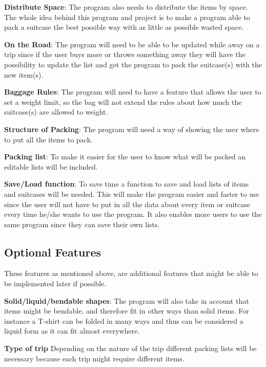 \textbf{Distribute Space}:
The program also needs to distribute the items by space. The whole idea behind this program and project is to make a program able to pack a suitcase the best possible way with as little as possible wasted space.
\newline

\textbf{On the Road}:
The program will need to be able to be updated while away on a trip since if the user buys more or throws something away they will have the possibility to update the list and get the program to pack the suitcase(s) with the new item(s).
\newline

\textbf{Baggage Rules}:
The program will need to have a feature that allows the user to set a weight limit, so the bag will not extend the rules about how much the suitcase(s) are allowed to weight.
\newline

\textbf{Structure of Packing}:
The program will need a way of showing the user where to put all the items to pack.
\newline

\textbf{Packing list}:
To make it easier for the user to know what will be packed an editable lists will be included.
\newline

\textbf{Save/Load function}:
To save time a function to save and load lists of items and suitcases will be needed. This will make the program easier and faster to use since the user will not have to put in all the data about every item or suitcase every time he/she wants to use the program. It also enables more users to use the same program since they can save their own lists.
\newline

\subsection{Optional Features}
These features as mentioned above, are additional features that might be able to be implemented later if possible.\newline

\textbf{Solid/liquid/bendable shapes}:
The program will also take in account that items might be bendable, and therefore fit in other ways than solid items. For instance a T-shirt can be folded in many ways and thus can be considered a liquid form as it can fit almost everywhere.
\newline

\textbf{Type of trip}
Depending on the nature of the trip different packing lists will be necessary because each trip might require different items.
\newline
